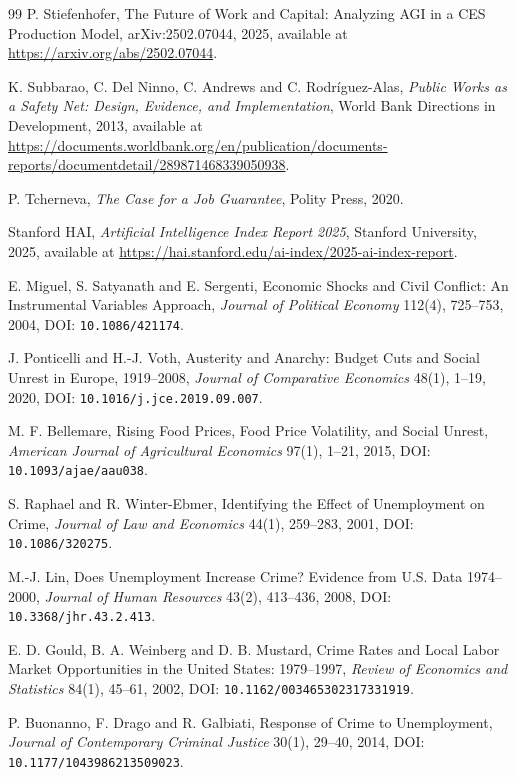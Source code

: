 \documentclass[review,12pt]{elsarticle}
\theoremstyle{plain}
\theoremstyle{definition}
\theoremstyle{remark}
\begin{document}
\begin{thebibliography}{99}
 P. Stiefenhofer, The Future of Work and Capital: Analyzing AGI in a CES Production Model, arXiv:2502.07044, 2025, available at \url{https://arxiv.org/abs/2502.07044}.

 K. Subbarao, C. Del Ninno, C. Andrews and C. Rodr\'iguez-Alas, \emph{Public Works as a Safety Net: Design, Evidence, and Implementation}, World Bank Directions in Development, 2013, available at \url{https://documents.worldbank.org/en/publication/documents-reports/documentdetail/289871468339050938}.

 P. Tcherneva, \emph{The Case for a Job Guarantee}, Polity Press, 2020.

 Stanford HAI, \emph{Artificial Intelligence Index Report 2025}, Stanford University, 2025, available at \url{https://hai.stanford.edu/ai-index/2025-ai-index-report}.

 E. Miguel, S. Satyanath and E. Sergenti, Economic Shocks and Civil Conflict: An Instrumental Variables Approach, \emph{Journal of Political Economy} 112(4), 725--753, 2004, DOI: \texttt{10.1086/421174}.

 J. Ponticelli and H.-J. Voth, Austerity and Anarchy: Budget Cuts and Social Unrest in Europe, 1919--2008, \emph{Journal of Comparative Economics} 48(1), 1--19, 2020, DOI: \texttt{10.1016/j.jce.2019.09.007}.

 M. F. Bellemare, Rising Food Prices, Food Price Volatility, and Social Unrest, \emph{American Journal of Agricultural Economics} 97(1), 1--21, 2015, DOI: \texttt{10.1093/ajae/aau038}.

 S. Raphael and R. Winter-Ebmer, Identifying the Effect of Unemployment on Crime, \emph{Journal of Law and Economics} 44(1), 259--283, 2001, DOI: \texttt{10.1086/320275}.

 M.-J. Lin, Does Unemployment Increase Crime? Evidence from U.S. Data 1974--2000, \emph{Journal of Human Resources} 43(2), 413--436, 2008, DOI: \texttt{10.3368/jhr.43.2.413}.

 E. D. Gould, B. A. Weinberg and D. B. Mustard, Crime Rates and Local Labor Market Opportunities in the United States: 1979--1997, \emph{Review of Economics and Statistics} 84(1), 45--61, 2002, DOI: \texttt{10.1162/003465302317331919}.

 P. Buonanno, F. Drago and R. Galbiati, Response of Crime to Unemployment, \emph{Journal of Contemporary Criminal Justice} 30(1), 29--40, 2014, DOI: \texttt{10.1177/1043986213509023}.


\end{thebibliography}
\end{document}
